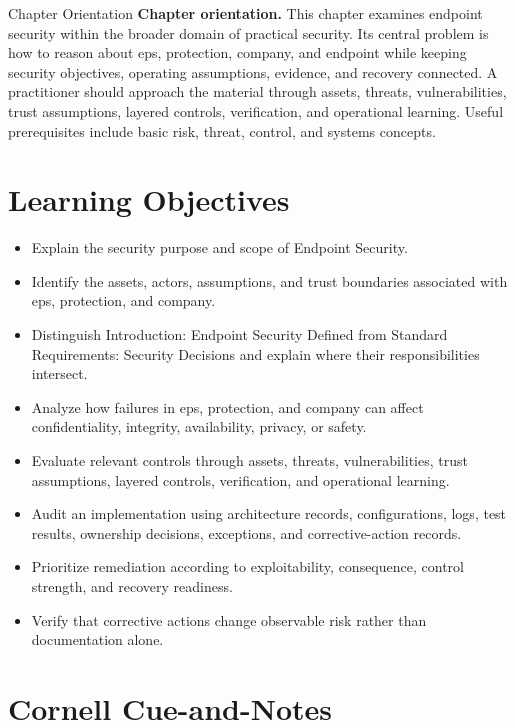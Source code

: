 \documentclass[11pt,letterpaper]{article}
\title{\CornellDocumentTitle}
\author{}
\date{}
\begin{document}
\maketitle
\begin{CornellOverviewBox}{Chapter Orientation}
\textbf{Chapter orientation.} This chapter examines endpoint security within the broader domain of practical security. Its central problem is how to reason about eps, protection, company, and endpoint while keeping security objectives, operating assumptions, evidence, and recovery connected. A practitioner should approach the material through assets, threats, vulnerabilities, trust assumptions, layered controls, verification, and operational learning. Useful prerequisites include basic risk, threat, control, and systems concepts.
\end{CornellOverviewBox}
\section*{Learning Objectives}
\begin{itemize}
\item Explain the security purpose and scope of Endpoint Security.
\item Identify the assets, actors, assumptions, and trust boundaries associated with eps, protection, and company.
\item Distinguish Introduction: Endpoint Security Defined from Standard Requirements: Security Decisions and explain where their responsibilities intersect.
\item Analyze how failures in eps, protection, and company can affect confidentiality, integrity, availability, privacy, or safety.
\item Evaluate relevant controls through assets, threats, vulnerabilities, trust assumptions, layered controls, verification, and operational learning.
\item Audit an implementation using architecture records, configurations, logs, test results, ownership decisions, exceptions, and corrective-action records.
\item Prioritize remediation according to exploitability, consequence, control strength, and recovery readiness.
\item Verify that corrective actions change observable risk rather than documentation alone.
\end{itemize}
\section*{Cornell Cue-and-Notes}
\end{document}
